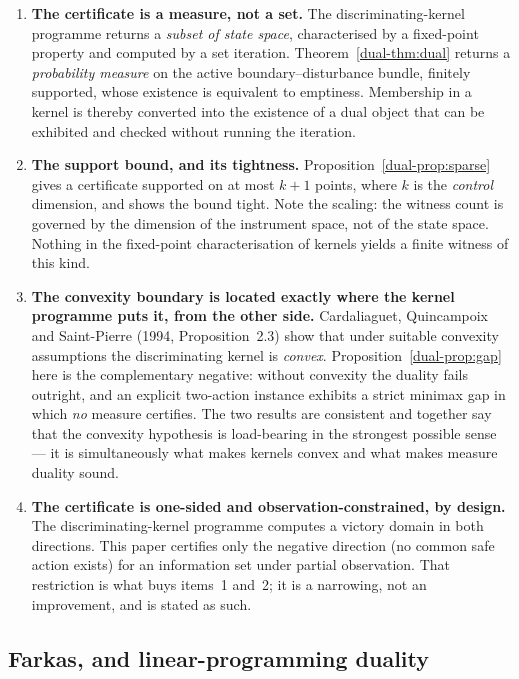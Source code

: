 \documentclass[10pt,twocolumn]{article}
\theoremstyle{plain}
\theoremstyle{definition}
\theoremstyle{remark}
\begin{document}
\begin{enumerate}
\item \textbf{The certificate is a measure, not a set.} The discriminating-kernel programme
  returns a \emph{subset of state space}, characterised by a fixed-point property and computed
  by a set iteration. Theorem~\ref{dual-thm:dual} returns a \emph{probability measure} on the
  active boundary--disturbance bundle, finitely supported, whose existence is equivalent to
  emptiness. Membership in a kernel is thereby converted into the existence of a dual object
  that can be exhibited and checked without running the iteration.
\item \textbf{The support bound, and its tightness.} Proposition~\ref{dual-prop:sparse} gives a
  certificate supported on at most $k+1$ points, where $k$ is the \emph{control} dimension,
  and shows the bound tight. Note the scaling: the witness count is governed by the dimension
  of the instrument space, not of the state space. Nothing in the fixed-point characterisation
  of kernels yields a finite witness of this kind.
\item \textbf{The convexity boundary is located exactly where the kernel programme puts it,
  from the other side.} Cardaliaguet, Quincampoix and Saint-Pierre (1994, Proposition~2.3)
  show that under suitable convexity assumptions the discriminating kernel is
  \emph{convex}. Proposition~\ref{dual-prop:gap} here is the complementary negative: without
  convexity the duality fails outright, and an explicit two-action instance exhibits a strict
  minimax gap in which \emph{no} measure certifies. The two results are consistent and
  together say that the convexity hypothesis is load-bearing in the strongest possible sense
  --- it is simultaneously what makes kernels convex and what makes measure duality sound.
\item \textbf{The certificate is one-sided and observation-constrained, by design.} The
  discriminating-kernel programme computes a victory domain in both directions. This paper
  certifies only the negative direction (no common safe action exists) for an information set
  under partial observation. That restriction is what buys items~1 and~2; it is a narrowing,
  not an improvement, and is stated as such.
\end{enumerate}

\subsection{Farkas, and linear-programming duality}
\end{document}
